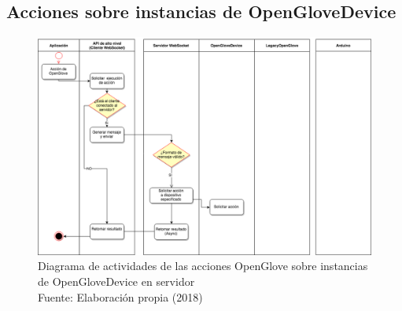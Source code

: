 \subsection{Acciones sobre instancias de OpenGloveDevice}
\begin{figure}[H]
  \begin{center} 
   	\includegraphics[width=1.0\textwidth]{images/chapter04/ActivityDiagrams-OpenGloveActions-2.png} 
   	\captionsetup{justification=centering}
    \caption[Diagrama de actividades de las acciones OpenGlove sobre instancias de OpenGloveDevice en servidor]{Diagrama de actividades de las acciones OpenGlove sobre instancias de OpenGloveDevice en servidor\\Fuente: Elaboración propia (2018)}
    \label{fig:activity-diagrams-2-openglovedevice}
  \end{center}
\end{figure}



